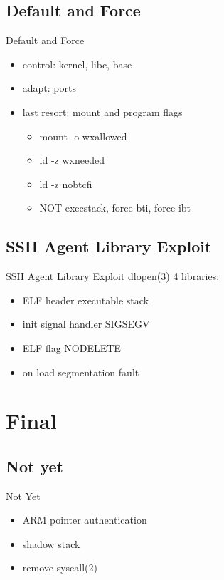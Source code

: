 \documentclass[14pt,aspectratio=169]{beamer}
\begin{document}
\subsection{Default and Force}
\begin{frame}{Default and Force}
\begin{itemize}
  \item control: kernel, libc, base
  \item adapt: ports
  \item last resort: mount and program flags
  \begin{itemize}
    \item mount -o wxallowed
    \item ld -z wxneeded
    \item ld -z nobtcfi
    \item NOT execstack, force-bti, force-ibt
  \end{itemize}
\end{itemize}
\end{frame}

\subsection{SSH Agent Library Exploit}
\begin{frame}{SSH Agent Library Exploit}
dlopen(3) 4 libraries:
\begin{itemize}
  \item ELF header executable stack
  \item init signal handler SIGSEGV
  \item ELF flag NODELETE
  \item on load segmentation fault
\end{itemize}
\end{frame}

\section{Final}

\subsection{Not yet}
\begin{frame}{Not Yet}
\begin{itemize}
  \item ARM pointer authentication
  \item shadow stack
  \item remove syscall(2)
\end{itemize}
\end{frame}
\end{document}
